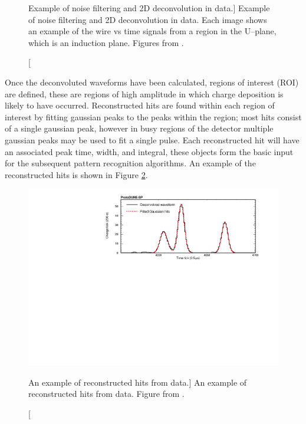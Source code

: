 \begin{figure}
	\caption
	[Example of noise filtering and 2D deconvolution in \protodune{} data.]
	{Example of noise filtering and 2D deconvolution in \protodune{} data. Each
	image shows an example of the wire vs time signals from a region in the
	U--plane, which is an induction plane. Figures from \cite{protoduneperf}.}

	\label{fig:2d_deconv}

\end{figure}

Once the deconvoluted waveforms have been calculated, regions of interest (ROI) 
are defined, these are regions of high amplitude in which charge deposition is
likely to have occurred. Reconstructed hits are found within each region of
interest by fitting gaussian peaks to the peaks within the region; most hits
consist of a single gaussian peak, however in busy regions of the detector
multiple gaussian peaks may be used to fit a single pulse. Each reconstructed
hit will have an associated peak time, width, and integral, these objects form
the basic input for the subsequent pattern recognition algorithms. An example of
the reconstructed hits is shown in Figure \ref{fig:gaushit}.

\begin{figure}

	\centering

	\includegraphics[width=\textwidth]{figures/gaushit.pdf}

	\caption
	[An example of reconstructed hits from \protodune{} data.]
	{An example of reconstructed hits from \protodune{} data. Figure from 
	\cite{protoduneperf}.}

	\label{fig:gaushit}

\end{figure}

